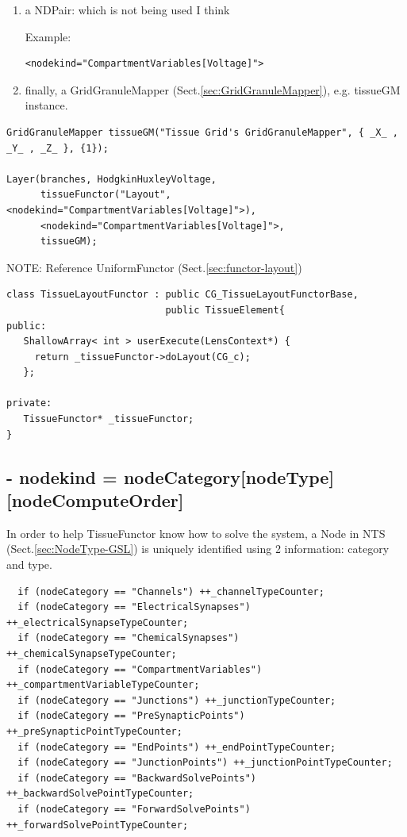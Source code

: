 \begin{enumerate}
\begin{itemize}
   \end{itemize}


  \item a NDPair: which is not being used I think

Example: 
\begin{verbatim}
<nodekind="CompartmentVariables[Voltage]">
\end{verbatim}  

  \item finally, a GridGranuleMapper (Sect.\ref{sec:GridGranuleMapper}), e.g.
  tissueGM instance.
\end{enumerate}  




\begin{verbatim}
GridGranuleMapper tissueGM("Tissue Grid's GridGranuleMapper", { _X_ , _Y_ , _Z_ }, {1});

Layer(branches, HodgkinHuxleyVoltage, 
      tissueFunctor("Layout", <nodekind="CompartmentVariables[Voltage]">),
      <nodekind="CompartmentVariables[Voltage]">, 
      tissueGM);
\end{verbatim}


NOTE: Reference UniformFunctor (Sect.\ref{sec:functor-layout})
\begin{verbatim}
class TissueLayoutFunctor : public CG_TissueLayoutFunctorBase, 
							public TissueElement{
public:
   ShallowArray< int > userExecute(LensContext*) {
     return _tissueFunctor->doLayout(CG_c);
   };
   
private:
   TissueFunctor* _tissueFunctor;
}
\end{verbatim}

\subsection{- nodekind = nodeCategory[nodeType][nodeComputeOrder]}
\label{sec:NodeKind}

In order to help TissueFunctor know how to solve the system,
a Node in NTS (Sect.\ref{sec:NodeType-GSL}) is uniquely identified using 2
information: category and type.

{\tiny
\begin{verbatim}
  if (nodeCategory == "Channels") ++_channelTypeCounter;
  if (nodeCategory == "ElectricalSynapses") ++_electricalSynapseTypeCounter;
  if (nodeCategory == "ChemicalSynapses") ++_chemicalSynapseTypeCounter;
  if (nodeCategory == "CompartmentVariables") ++_compartmentVariableTypeCounter;
  if (nodeCategory == "Junctions") ++_junctionTypeCounter;
  if (nodeCategory == "PreSynapticPoints") ++_preSynapticPointTypeCounter;
  if (nodeCategory == "EndPoints") ++_endPointTypeCounter;
  if (nodeCategory == "JunctionPoints") ++_junctionPointTypeCounter;
  if (nodeCategory == "BackwardSolvePoints") ++_backwardSolvePointTypeCounter;
  if (nodeCategory == "ForwardSolvePoints") ++_forwardSolvePointTypeCounter;
\end{verbatim}
}

